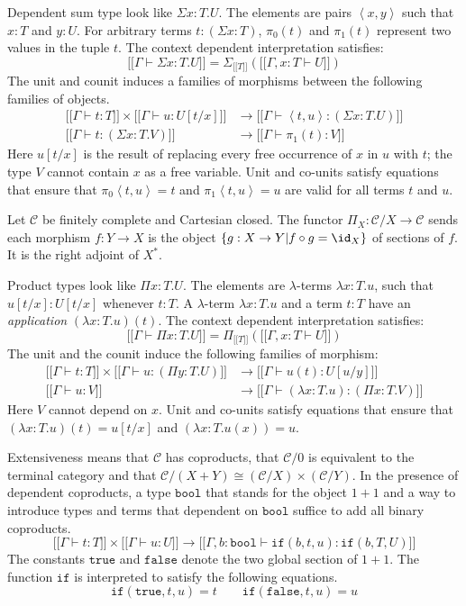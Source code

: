 \documentclass{tac}
\newcommand\cat\mathcal
\newcommand\set[1]{\left\{#1\right\}}
\newcommand\ri{^*}
\newcommand\of{:}
\newcommand\db[1]{{[\![}#1{]\!]}}
\newcommand\dsum{\Sigma_}
\newcommand\dprod{\Pi_}
\newcommand\tuplet[1]{\left\langle #1 \right\rangle}
\newcommand\true{\mathtt{true}}
\newcommand\false{\mathtt{false}}
\newcommand\bool{\mathtt{bool}}
\newcommand\ttif{\mathtt{if}}
\begin{document}
Dependent sum type look like $\Sigma x\of T.U$. The elements are pairs $\tuplet{x,y}$ such that $x\of T$ and $y\of U$. For arbitrary terms $t\of(\Sigma x\of T)$, $\pi_0(t)$ and $\pi_1(t)$ represent two values in the tuple $t$. The context dependent interpretation satisfies:
\[ \db{\Gamma\vdash\Sigma x\of T.U} = \dsum {\db T}(\db{\Gamma,x\of T\vdash U}) \]
The unit and counit induces a families of morphisms between the following families of objects.
\begin{align*}
\db{\Gamma\vdash t\of T}\times\db{\Gamma\vdash u\of U[t/x]} &\to \db{\Gamma\vdash \tuplet{t, u}\of(\Sigma x\of T.U)}\\
\db{\Gamma\vdash t\of (\Sigma x\of T.V)}&\to \db{\Gamma\vdash \pi_1(t) \of V}
\end{align*}
Here $u[t/x]$ is the result of replacing every free occurrence of $x$ in $u$ with $t$; the type $V$ cannot contain $x$ as a free variable. Unit and co-units satisfy equations that ensure that $\pi_0\tuplet{t,u}=t$ and $\pi_1\tuplet{t,u}=u$ are valid for all terms $t$ and $u$.


Let $\cat C$ be finitely complete and Cartesian closed. The functor $\dprod X\of\cat C/X\to \cat C$ sends each morphism $f\of Y\to X$ is the object $\set{g\of X\to Y| f\circ g = \id_X }$ of sections of $f$. It is the right adjoint of $X\ri$.

Product types look like $\Pi x\of T.U$. The elements are $\lambda$-terms $\lambda x\of T.u$, such that $u[t/x]\of U[t/x]$ whenever $t\of T$. A $\lambda$-term $\lambda x\of T.u$ and a term $t\of T$ have an \emph{application} $(\lambda x\of T.u)(t)$. The context dependent interpretation satisfies:
\[ \db{\Gamma\vdash\Pi x\of T.U} = \dprod {\db T}(\db{\Gamma,x\of T\vdash U}) \]
The unit and the counit induce the following families of morphism:
\begin{align*}
\db{\Gamma\vdash t\of T}\times\db{\Gamma\vdash u\of(\Pi y\of T.U)}&\to\db{\Gamma\vdash u(t)\of U[u/y]}\\
\db{\Gamma\vdash u\of V}&\to\db{\Gamma\vdash (\lambda x\of T.u)\of(\Pi x\of T.V)}
\end{align*}
Here $V$ cannot depend on $x$. Unit and co-units satisfy equations that ensure that $(\lambda x\of T.u)(t) = u[t/x]$ and $(\lambda x\of T.u(x))=u$.

Extensiveness means that $\cat C$ has coproducts, that $\cat C/0$ is equivalent to the terminal category and that $\cat C/(X+Y)\cong (\cat C/X)\times(\cat C/Y)$. In the presence of dependent coproducts, a type $\bool$ that stands for the object $1+1$ and a way to introduce types and terms that dependent on $\bool$ suffice to add all binary coproducts.
\[ \db{\Gamma\vdash t\of T}\times\db{\Gamma\vdash u\of U}\to\db{\Gamma,b\of\bool\vdash \ttif(b,t,u)\of\ttif(b,T,U)} \]
The constants $\true$ and $\false$ denote the two global section of $1+1$. The function $\ttif$ is interpreted to satisfy the following equations.
\[ \ttif(\true,t,u)=t\qquad\ttif(\false,t,u) = u\]
\end{document}
